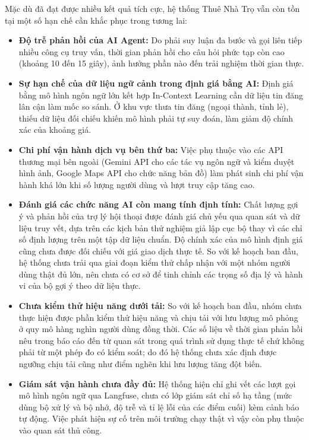 Mặc dù đã đạt được nhiều kết quả tích cực, hệ thống Thuê Nhà Trọ vẫn còn tồn tại một số hạn chế cần khắc phục trong tương lai:
\begin{itemize}
    \item \textbf{Độ trễ phản hồi của AI Agent:} Do phải suy luận đa bước và gọi liên tiếp nhiều công cụ truy vấn, thời gian phản hồi cho câu hỏi phức tạp còn cao (khoảng 10 đến 15 giây), ảnh hưởng phần nào đến trải nghiệm thời gian thực.
    \item \textbf{Sự hạn chế của dữ liệu ngữ cảnh trong định giá bằng AI:} Định giá bằng mô hình ngôn ngữ lớn kết hợp In-Context Learning cần dữ liệu tin đăng lân cận làm mốc so sánh. Ở khu vực thưa tin đăng (ngoại thành, tỉnh lẻ), thiếu dữ liệu đối chiếu khiến mô hình phải tự suy đoán, làm giảm độ chính xác của khoảng giá.
    \item \textbf{Chi phí vận hành dịch vụ bên thứ ba:} Việc phụ thuộc vào các API thương mại bên ngoài (Gemini API cho các tác vụ ngôn ngữ và kiểm duyệt hình ảnh, Google Maps API cho chức năng bản đồ) làm phát sinh chi phí vận hành khá lớn khi số lượng người dùng và lượt truy cập tăng cao.
    \item \textbf{Đánh giá các chức năng AI còn mang tính định tính:} Chất lượng gợi ý và phản hồi của trợ lý hội thoại được đánh giá chủ yếu qua quan sát và dữ liệu truy vết, dựa trên các kịch bản thử nghiệm giả lập cục bộ thay vì các chỉ số định lượng trên một tập dữ liệu chuẩn. Độ chính xác của mô hình định giá cũng chưa được đối chiếu với giá giao dịch thực tế. So với kế hoạch ban đầu, hệ thống chưa trải qua giai đoạn kiểm thử chấp nhận với một nhóm người dùng thật đủ lớn, nên chưa có cơ sở để tinh chỉnh các trọng số địa lý và hành vi của bộ gợi ý theo dữ liệu thực.

    \item \textbf{Chưa kiểm thử hiệu năng dưới tải:} So với kế hoạch ban đầu, nhóm chưa thực hiện được phần kiểm thử hiệu năng và chịu tải với lưu lượng mô phỏng ở quy mô hàng nghìn người dùng đồng thời. Các số liệu về thời gian phản hồi nêu trong báo cáo đến từ quan sát trong quá trình sử dụng thực tế chứ không phải từ một phép đo có kiểm soát; do đó hệ thống chưa xác định được ngưỡng chịu tải cũng như điểm nghẽn khi lưu lượng tăng đột biến.

    \item \textbf{Giám sát vận hành chưa đầy đủ:} Hệ thống hiện chỉ ghi vết các lượt gọi mô hình ngôn ngữ qua Langfuse, chưa có lớp giám sát chỉ số hạ tầng (mức dùng bộ xử lý và bộ nhớ, độ trễ và tỉ lệ lỗi của các điểm cuối) kèm cảnh báo tự động. Việc phát hiện sự cố trên môi trường chạy thật vì vậy còn phụ thuộc vào quan sát thủ công.


\end{itemize}
